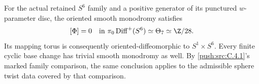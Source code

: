 \begin{theorem}\label{push:src:C.3.24}
For the actual retained $S^6$ family and a positive generator
of its punctured $w$-parameter disc, the oriented smooth
monodromy satisfies
\[
 [\Phi]=0\quad\hbox{in }\pi_0\operatorname{Diff}^+(S^6)
                       \simeq\Theta_7\simeq\Z/28.
\]
Its mapping torus is consequently oriented-diffeomorphic to
$S^1\times S^6$. Every finite cyclic base change has trivial
smooth monodromy as well. By \ref{push:src:C.4.1}'s marked family comparison,
the same conclusion applies to the admissible sphere twist
data covered by that comparison.
\end{theorem}

